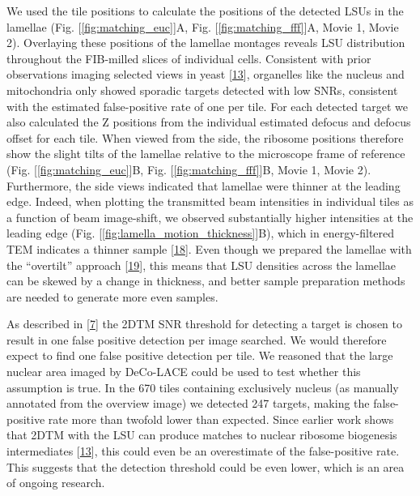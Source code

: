 \documentclass[
]{article}
\begin{document}
We used the tile positions to calculate the positions of the detected
LSUs in the lamellae (Fig. {[}\ref{fig:matching_euc}{]}A, Fig. {[}\ref{fig:matching_fff}{]}A, Movie 1, Movie 2). Overlaying these positions of the lamellae montages reveals LSU
distribution throughout the FIB-milled slices of individual cells. Consistent with prior observations imaging selected views in yeast {[}\protect\hyperlink{ref-T1Qr0xyP}{13}{]}, organelles
like the nucleus and mitochondria only showed sporadic targets detected with low
SNRs, consistent with the estimated false-positive rate of one per tile. For
each detected target we also calculated the Z positions from the individual
estimated defocus and defocus offset for each tile. When viewed from the side,
the ribosome positions therefore show the slight tilts of the lamellae relative
to the microscope frame of reference (Fig. {[}\ref{fig:matching_euc}{]}B, Fig.
{[}\ref{fig:matching_fff}{]}B, Movie 1, Movie 2). Furthermore, the side views indicated that lamellae
were thinner at the leading edge. Indeed, when plotting the transmitted beam
intensities in individual tiles as a function of beam image-shift, we observed
substantially higher intensities at the leading edge (Fig. {[}\ref{fig:lamella_motion_thickness}{]}B), which in energy-filtered
TEM indicates a thinner sample {[}\protect\hyperlink{ref-17IP4Lhz1}{18}{]}. Even though we prepared the lamellae
with the ``overtilt'' approach {[}\protect\hyperlink{ref-hr3dyUeI}{19}{]}, this means that LSU densities across
the lamellae can be skewed by a change in thickness, and better sample
preparation methods are needed to generate more even samples.

As described in {[}\protect\hyperlink{ref-Ynb3IP6I}{7}{]} the 2DTM SNR threshold for detecting a target is chosen to result in one false positive detection per image searched. We would therefore expect to find one false positive detection per tile. We reasoned that the large nuclear area imaged by DeCo-LACE could be used to test whether this assumption is true. In the 670 tiles containing exclusively nucleus (as manually annotated from the overview image) we detected 247 targets, making the false-positive rate more than twofold lower than expected. Since earlier work shows that 2DTM with the LSU can produce matches to nuclear ribosome biogenesis intermediates {[}\protect\hyperlink{ref-T1Qr0xyP}{13}{]}, this could even be an overestimate of the false-positive rate. This suggests that the detection threshold could be even lower, which is an area of ongoing research.
\end{document}
